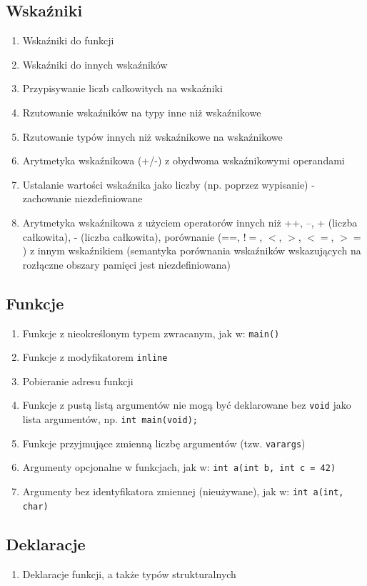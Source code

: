 \documentclass[a4paper,twoside,openright,11pt]{report}
\begin{document}
  \subsection {Wskaźniki}
    \begin{enumerate}
      \item Wskaźniki do funkcji
      \item Wskaźniki do innych wskaźników
      \item Przypisywanie liczb całkowitych na wskaźniki
      \item Rzutowanie wskaźników na typy inne niż wskaźnikowe
      \item Rzutowanie typów innych niż wskaźnikowe na wskaźnikowe
      \item Arytmetyka wskaźnikowa (+/-) z obydwoma wskaźnikowymi operandami
      \item Ustalanie wartości wskaźnika jako liczby (np. poprzez wypisanie) - zachowanie niezdefiniowane
      \item Arytmetyka wskaźnikowa z użyciem operatorów innych niż ++, --, + (liczba całkowita), - (liczba całkowita), porównanie (==, !$=$, $<$, $>$, $<=$, $>=$) z innym wskaźnikiem (semantyka porównania wskaźników wskazujących na rozłączne obszary pamięci jest niezdefiniowana)
    \end{enumerate}
  \subsection {Funkcje}
    \begin{enumerate}
      \item Funkcje z nieokreślonym typem zwracanym, jak w: \texttt{main()} { }
      \item Funkcje z modyfikatorem \texttt{inline}
      \item Pobieranie adresu funkcji
      \item Funkcje z pustą listą argumentów nie mogą być deklarowane bez \texttt{void} jako lista argumentów, np. \texttt{int main(void);}
      \item Funkcje przyjmujące zmienną liczbę argumentów (tzw. \texttt{varargs})
      \item Argumenty opcjonalne w funkcjach, jak w: \texttt{int a(int b, int c = 42)} { }
      \item Argumenty bez identyfikatora zmiennej (nieużywane), jak w: \texttt{int a(int, char)} { }
    \end{enumerate}
  \subsection {Deklaracje}
    \begin{enumerate}
      \item Deklaracje funkcji, a także typów strukturalnych 
    \end{enumerate}
\end{document}
